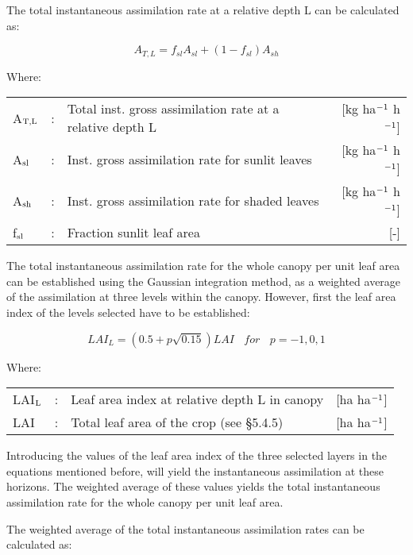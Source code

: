 The total instantaneous assimilation rate at a relative depth L can be calculated as:

\begin{equation}
A_{T,L} = f_{sl} A_{sl} + (1 - f_{sl}) A_{sh} 
\end{equation}

Where:\\[5pt]
\begin{tabularx}{\textwidth}{llXr}
A$_{{\rm T,L}}$ &:& Total inst. gross assimilation rate at a relative depth L   &
     [kg ha$^{{\rm -1}}$ h$^{{\rm -1}}$]\\
A$_{{\rm sl}}$ &:& Inst. gross assimilation rate for sunlit leaves  & 
     [kg ha$^{{\rm -1}}$ h$^{{\rm -1}}$]\\
A$_{{\rm sh}}$ &:& Inst. gross assimilation rate for shaded leaves  & 
     [kg ha$^{{\rm -1}}$ h$^{{\rm -1}}$]\\
f$_{{\rm sl}}$ &:& Fraction sunlit leaf area  &  [-]\\
\end{tabularx}

The total instantaneous assimilation rate for the whole canopy per unit leaf area can be
established using the Gaussian integration method, as a weighted average of the assimilation 
at three levels within the canopy.
However, first the leaf area index of the levels selected have to be established:

\begin{equation}
LAI_{L} = (0.5+p \sqrt{0.15})LAI~~~~for~~~~p=-1,0,1
\end{equation}

Where:\\[5pt]
\begin{tabularx}{\textwidth}{llXr}
LAI$_{{\rm L}}$ &:& Leaf area index at relative depth L in canopy    &    [ha ha$^{{\rm -1}}$]\\
LAI &:& Total leaf area of the crop (see \S 5.4.5) &   [ha ha$^{{\rm -1}}$]\\
\end{tabularx}

Introducing the values of the leaf area index of the three selected layers in the equations
mentioned before, will yield the instantaneous assimilation at these horizons. The
weighted average of these values yields the total instantaneous assimilation rate for the
whole canopy per unit leaf area.

The weighted average of the total instanta\-neous assimilation rates can be calculated as:

